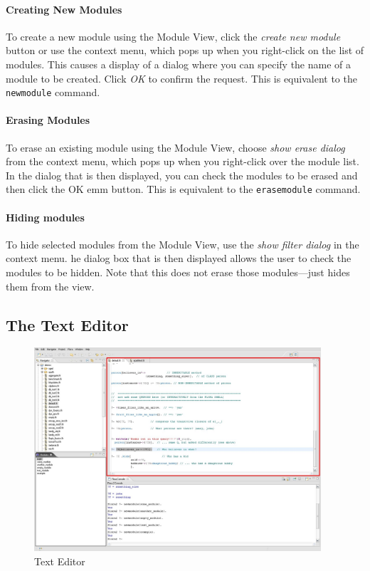 \paragraph{Creating New \FLORA Modules}
\label{sec:moduleview_usage_createmodules}

To create a new \FLORA module using the \FVIZ Module View,
click the \emph{create new module} button or use the context menu, which
pops up when you
right-click on the list of modules.
This causes a display of a dialog where you can specify  the name of a
module to be created.
Click \emph{OK} to confirm the request.
This is equivalent to the {\tt newmodule} command.

\paragraph{Erasing \FLORA Modules}
\label{sec:moduleview_usage_erasemodules}

To erase an existing module using the Module View, choose
\emph{show erase dialog} from the context menu, which pops up when you
right-click over the module list. In the dialog that is then displayed, you
can check the modules to be erased and then click the OK emm button.
This is equivalent to the {\tt erasemodule} command.


\paragraph{Hiding  \FLORA modules}
\label{sec:moduleview_usage_filtermodules}

To hide selected \FLORA modules from the \FVIZ Module View, use
the \emph{show filter dialog} in the context menu.
he dialog box that is then displayed allows the user to check the modules
to be hidden. Note that this does not erase those modules---just hides them
from the view.

\subsection{The \FVIZ Text Editor}
\label{sec:texteditor}

\begin{figure}[tbh]
	\centering
		\includegraphics[width=0.95\textwidth]{fviz_editor}
	\caption{\FVIZ Text Editor}
	\label{fig:fviz_editor}
\end{figure}

